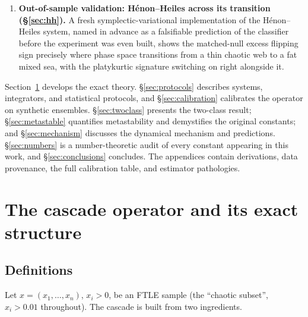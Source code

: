 \documentclass[11pt,a4paper]{article}
\theoremstyle{remark}
\begin{document}
\begin{enumerate}
self-averaging predicts $\beta = 1$). The canonical release ensemble (uniform angles, zero
velocity) turns out to be a mixture over energy shells ($E(\theta)$ explains
$\eta^2 = 0.41$--$0.43$ of the variance) and over invariant components within shells (the remaining
$59\%$, equally frozen). Energy bands internally recapitulate the entire two-class taxonomy within
one system.
\item \textbf{Out-of-sample validation: H\'enon--Heiles across its transition
(\S\ref{sec:hh}).} A fresh symplectic-variational implementation of the H\'enon--Heiles system,
named in advance as a falsifiable prediction of the classifier before the experiment was even built,
shows the matched-null excess flipping sign precisely where phase space transitions from a thin
chaotic web to a fat mixed sea, with the platykurtic signature switching on right alongside it.
\end{enumerate}

Section~\ref{sec:operator} develops the exact theory. \S\ref{sec:protocols} describes systems,
integrators, and statistical protocols, and \S\ref{sec:calibration} calibrates the operator on
synthetic ensembles. \S\ref{sec:twoclass} presents the two-class result; \S\ref{sec:metastable}
quantifies metastability and demystifies the original constants; and \S\ref{sec:mechanism} discusses
the dynamical mechanism and predictions. \S\ref{sec:numbers} is a number-theoretic audit of every
constant appearing in this work, and \S\ref{sec:conclusions} concludes. The appendices contain
derivations, data provenance, the full calibration table, and estimator pathologies.

\section{The cascade operator and its exact structure}\label{sec:operator}

\subsection{Definitions}

Let $x = (x_1,\dots,x_n)$, $x_i>0$, be an FTLE sample (the ``chaotic subset'', $x_i > 0.01$
throughout). The cascade is built from two ingredients.
\end{document}
